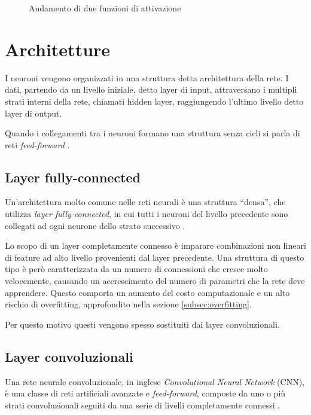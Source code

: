 \begin{figure}[htb]
	\centering
	\quad
	
	\caption{Andamento di due funzioni di attivazione}
	\label{fig:subfig}
\end{figure}

\section{Architetture}
\label{sec:architetture}

I neuroni vengono organizzati in una struttura detta architettura della rete.
I dati, partendo da un livello iniziale, detto layer di input, attraversano i multipli strati interni della rete, chiamati hidden layer, raggiungendo l'ultimo livello detto layer di output.

Quando i collegamenti tra i neuroni formano una struttura senza cicli si parla di reti \emph{feed-forward} \cite{svozil1997introduction}.

\subsection{Layer fully-connected}
\label{subsec:fc}

Un’architettura molto comune nelle reti neurali è una struttura ``densa'', che utilizza \emph{layer fully-connected}, in cui tutti i neuroni del livello precedente sono collegati ad ogni neurone dello strato successivo \cite{sainath2015convolutional}.

Lo scopo di un layer completamente connesso è imparare combinazioni non lineari di feature ad alto livello provenienti dal layer precedente. 
Una struttura di questo tipo è però caratterizzata da un numero di connessioni che cresce molto velocemente, causando un accrescimento del numero di parametri che la rete deve apprendere.
Questo comporta un aumento del costo computazionale e un alto rischio di overfitting, approfondito nella sezione \ref{subsec:overfitting}.

Per questo motivo questi vengono spesso sostituiti dai layer convoluzionali.

\subsection{Layer convoluzionali}
\label{subsec:cnn}
Una rete neurale convoluzionale, in inglese \emph{Convolutional Neural Network} (CNN), è una classe di reti artificiali avanzate e \emph{feed-forward}, composte da uno o più strati convoluzionali seguiti da una serie di livelli completamente connessi \cite{kim2014convolutional}.

